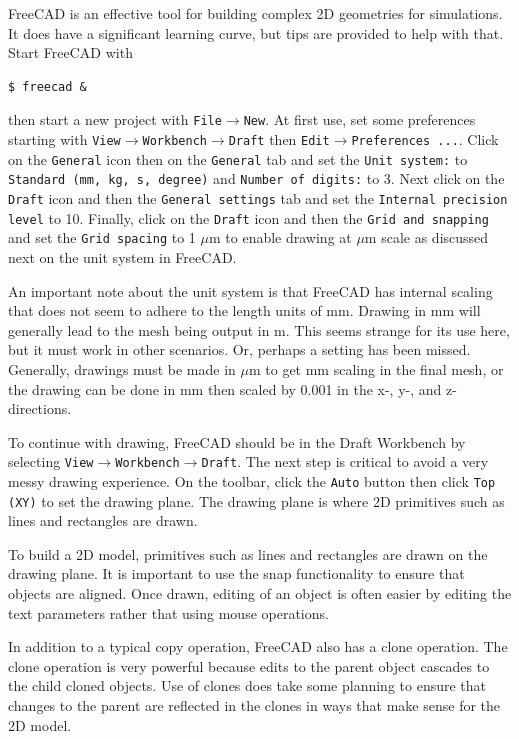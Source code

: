 \documentclass[titlepage]{article}
\renewcommand\_{\textunderscore\linebreak[1]}
\begin{document}
FreeCAD is an effective tool for building complex 2D geometries for simulations.  It does have a significant learning curve, but tips are provided to help with that.  Start FreeCAD with
\begin{Verbatim}[fontsize=\small]
   $ freecad &
\end{Verbatim}
\noindent then start a new project with \texttt{File}$\rightarrow$\texttt{New}.
At first use, set some preferences starting with \newline \texttt{View}$\rightarrow$\texttt{Workbench}$\rightarrow$\texttt{Draft} then \texttt{Edit}$\rightarrow$\texttt{Preferences ...}.
Click on the \texttt{General} icon then on the \texttt{General} tab and set the \texttt{Unit system:} to \texttt{Standard (mm, kg, s, degree)} and \texttt{Number of digits:} to 3.
Next click on the \texttt{Draft} icon and then the \texttt{General settings} tab and set the \texttt{Internal precision level} to 10. Finally, click on the \texttt{Draft} icon and then the \texttt{Grid and snapping} and set the \texttt{Grid spacing} to 1 $\mu$m to enable drawing at $\mu$m scale as discussed next on the unit system in FreeCAD.

An important note about the unit system is that FreeCAD has internal scaling that does not seem to adhere to the length units of mm.  Drawing in mm will generally lead to the mesh being output in m.  This seems strange for its use here, but it must work in other scenarios.  Or, perhaps a setting has been missed.  Generally, drawings must be made in $\mu$m to get mm scaling in the final mesh, or the drawing can be done in mm then scaled by 0.001 in the x-, y-, and z- directions.

To continue with drawing, FreeCAD should be in the Draft Workbench by selecting \newline\texttt{View}$\rightarrow$\texttt{Workbench}$\rightarrow$\texttt{Draft}.  The next step is critical to avoid a very messy drawing experience.  On the toolbar, click the \texttt{Auto} button then click \texttt{Top (XY)} to set the drawing plane.  The drawing plane is where 2D primitives such as lines and rectangles are drawn.

To build a 2D model, primitives such as lines and rectangles are drawn on the drawing plane.  It is important to use the snap functionality to ensure that objects are aligned.  Once drawn, editing of an object is often easier by editing the text parameters rather that using mouse operations.

In addition to a typical copy operation, FreeCAD also has a clone operation.  The clone operation is very powerful because edits to the parent object cascades to the child cloned objects.  Use of clones does take some planning to ensure that changes to the parent are reflected in the clones in ways that make sense for the 2D model.
\end{document}
